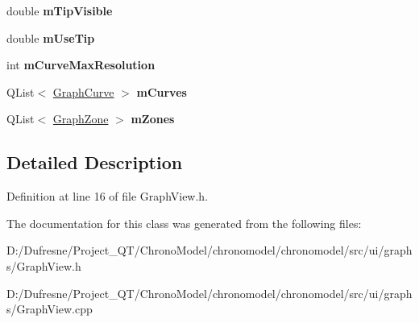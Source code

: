 \begin{DoxyCompactItemize}
\item 
\hypertarget{class_graph_view_ae98bae5970ac73bcc115c496f45bacb8}{double {\bfseries m\-Tip\-Visible}}\label{class_graph_view_ae98bae5970ac73bcc115c496f45bacb8}

\item 
\hypertarget{class_graph_view_a1ef173a6dfabe424d466d99d160a33e0}{double {\bfseries m\-Use\-Tip}}\label{class_graph_view_a1ef173a6dfabe424d466d99d160a33e0}

\item 
\hypertarget{class_graph_view_ab58c78780611db849a24f94e74cf7735}{int {\bfseries m\-Curve\-Max\-Resolution}}\label{class_graph_view_ab58c78780611db849a24f94e74cf7735}

\item 
\hypertarget{class_graph_view_a3afa24f83f0b7322eab484ce4d33c2ae}{Q\-List$<$ \hyperlink{class_graph_curve}{Graph\-Curve} $>$ {\bfseries m\-Curves}}\label{class_graph_view_a3afa24f83f0b7322eab484ce4d33c2ae}

\item 
\hypertarget{class_graph_view_ad5779a8d7d8a4e9d449a49ec3970c1c2}{Q\-List$<$ \hyperlink{class_graph_zone}{Graph\-Zone} $>$ {\bfseries m\-Zones}}\label{class_graph_view_ad5779a8d7d8a4e9d449a49ec3970c1c2}

\end{DoxyCompactItemize}


\subsection{Detailed Description}


Definition at line 16 of file Graph\-View.\-h.



The documentation for this class was generated from the following files\-:\begin{DoxyCompactItemize}
\item 
D\-:/\-Dufresne/\-Project\-\_\-\-Q\-T/\-Chrono\-Model/chronomodel/chronomodel/src/ui/graphs/Graph\-View.\-h\item 
D\-:/\-Dufresne/\-Project\-\_\-\-Q\-T/\-Chrono\-Model/chronomodel/chronomodel/src/ui/graphs/Graph\-View.\-cpp\end{DoxyCompactItemize}
